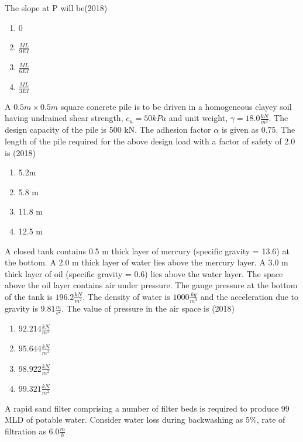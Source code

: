     The slope at P will be\hfill (2018)
    \begin{enumerate}[label= (\Alph*)]
        \item 0
        \item $\frac{ML}{9EI}$
        \item $\frac{ML}{6EI}$
        \item $\frac{ML}{3EI}$
    \end{enumerate}
    \item A $0.5 m \times 0.5 m$ square concrete pile is to be driven in a homogeneous clayey soil having
    undrained shear strength, $c_u = 50 kPa$ and unit weight, $\gamma = 18.0 \frac{kN}{m^3}$. The design capacity
    of the pile is 500 kN. The adhesion factor $\alpha$ is given as 0.75. The length of the pile required
    for the above design load with a factor of safety of 2.0\\ is \hfill (2018)
    \begin{enumerate}[label = (\Alph*)]
        \item 5.2m 
        \item 5.8 m 
        \item 11.8 m
        \item 12.5 m 
    \end{enumerate}
    \item A closed tank contains 0.5 m thick layer of mercury (specific gravity = 13.6) at the bottom.
    A 2.0 m thick layer of water lies above the mercury layer. A 3.0 m thick layer of oil
    (specific gravity = 0.6) lies above the water layer. The space above the oil layer contains
    air under pressure. The gauge pressure at the bottom of the tank is $196.2 \frac{kN}{m^2}$. The density of water is $1000 \frac{kg}{m^3}$
    and the acceleration due to gravity is $9.81 \frac{m}{s^2}$. The value
    of pressure in the air space is \hfill (2018)
    \begin{enumerate}[label=(\Alph*)]
        \item $92.214 \frac{kN}{m^2}$
        \item $95.644 \frac{kN}{m^2}$
        \item $98.922 \frac{kN}{m^2}$
        \item $99.321 \frac{kN}{m^2}$
    \end{enumerate} 
    \item A rapid sand filter comprising a number of filter beds is required to produce 99 MLD of
    potable water. Consider water loss during backwashing as 5\%, rate of filtration as $6.0 \frac{m}{h}$

